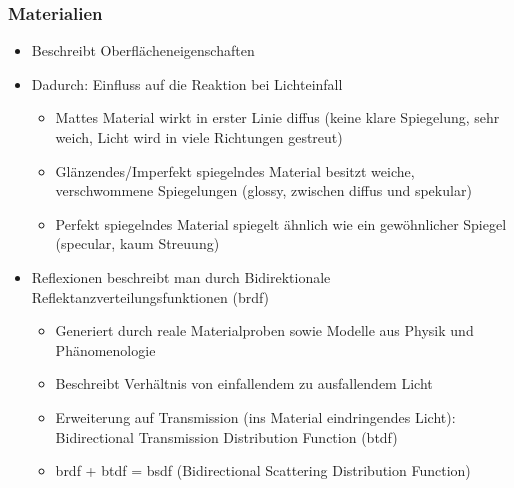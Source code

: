 \documentclass[10pt,a4paper]{article}
\begin{document}
	\subsubsection{Materialien}
	\begin{itemize}
		\item Beschreibt Oberflächeneigenschaften
		\item Dadurch: Einfluss auf die Reaktion bei Lichteinfall
		\begin{itemize}
			\item Mattes Material wirkt in erster Linie diffus (keine klare Spiegelung, sehr weich, Licht wird in viele Richtungen gestreut)
			\item Glänzendes/Imperfekt spiegelndes Material besitzt weiche, verschwommene Spiegelungen (\glqq glossy\grqq, zwischen diffus und spekular)
			\item Perfekt spiegelndes Material spiegelt ähnlich wie ein gewöhnlicher Spiegel (\glqq specular\grqq, kaum Streuung)
		\end{itemize}
		\item Reflexionen beschreibt man durch Bidirektionale Reflektanzverteilungsfunktionen (\Gls{brdf})
		\begin{itemize}
			\item Generiert durch reale Materialproben sowie Modelle aus Physik und Phänomenologie
			\item Beschreibt Verhältnis von einfallendem zu ausfallendem Licht
			\item Erweiterung auf Transmission (ins Material eindringendes Licht): Bidirectional Transmission Distribution Function (\Gls{btdf})
			\item \Gls{brdf} + \Gls{btdf} = \Gls{bsdf} (Bidirectional Scattering Distribution Function)
		\end{itemize}
	\end{itemize}
\end{document}
